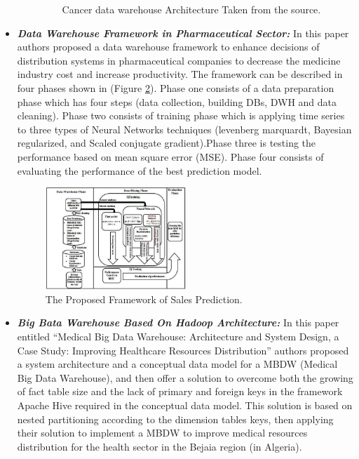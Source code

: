 \begin{itemize}
\begin{enumerate}
\begin{figure}[h!]
      \caption{Cancer data warehouse Architecture Taken from the source.}
      \label{fig:cancersystem}
    \end{figure}
    \end{enumerate}
    
    \item \textbf{\textit{Data Warehouse Framework in Pharmaceutical Sector:}} In this paper\cite{abd2019proposed} authors proposed a data warehouse framework to enhance decisions of distribution systems in pharmaceutical companies to decrease the medicine industry cost and increase productivity. The framework can be described in four phases shown in (Figure \ref{fig:pharmacysystem}). Phase one consists of a data preparation phase which has four steps (data collection, building DBs, DWH and data cleaning). Phase two consists of training phase which is applying time series to three types of Neural Networks techniques (levenberg marquardt, Bayesian regularized, and Scaled conjugate gradient).Phase three is testing the performance based on mean square error (MSE). Phase four consists of evaluating the performance of the best prediction model.
    \begin{figure}[h!]
      \center
      \includegraphics[width=0.50\textwidth]{images/chapter2/pharmacysystem.PNG}
      \caption{The Proposed Framework of Sales Prediction.}
      \label{fig:pharmacysystem}
    \end{figure}
    \newpage
    \item \textbf{\textit{Big Bata Warehouse Based On Hadoop Architecture:}} In this paper\cite{sebaa2018medical} entitled “Medical Big Data Warehouse: Architecture and System Design, a Case Study: Improving Healthcare Resources Distribution” authors proposed a system architecture and a conceptual data model for a MBDW (Medical Big Data Warehouse), and then offer a solution to overcome both the growing of fact table size and the lack of primary and foreign keys in the framework Apache Hive required in the conceptual data model. This solution is based on nested partitioning according to the dimension tables keys, then  applying their solution to implement a MBDW to improve medical resources distribution for the health sector in the Bejaia region (in Algeria). 
    

\end{itemize}
